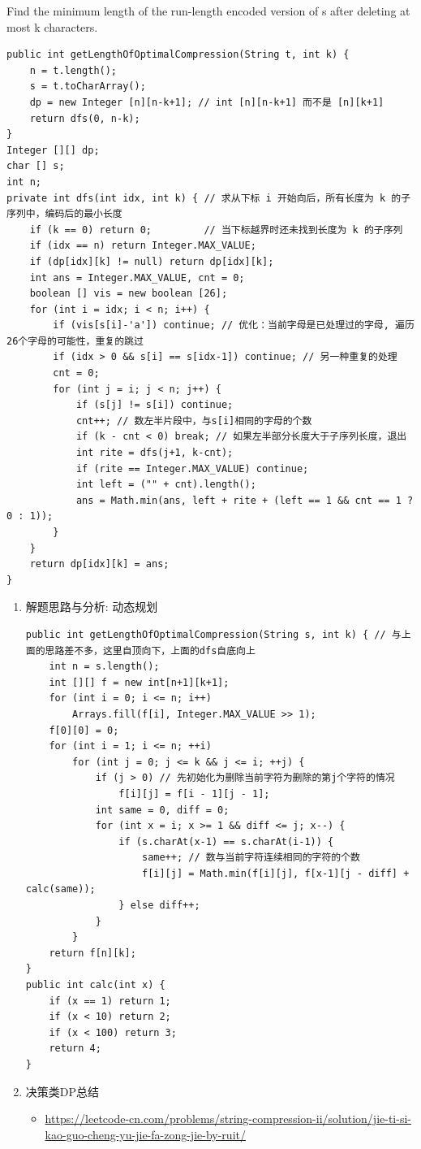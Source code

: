 \documentclass[9pt, b5paaper]{book}
\begin{document}
Find the minimum length of the run-length encoded version of s after deleting at most k characters.
\begin{verbatim}
public int getLengthOfOptimalCompression(String t, int k) {
    n = t.length();
    s = t.toCharArray();
    dp = new Integer [n][n-k+1]; // int [n][n-k+1] 而不是 [n][k+1] 
    return dfs(0, n-k);
}
Integer [][] dp;
char [] s;
int n;
private int dfs(int idx, int k) { // 求从下标 i 开始向后，所有长度为 k 的子序列中，编码后的最小长度
    if (k == 0) return 0;         // 当下标越界时还未找到长度为 k 的子序列
    if (idx == n) return Integer.MAX_VALUE;
    if (dp[idx][k] != null) return dp[idx][k];
    int ans = Integer.MAX_VALUE, cnt = 0;
    boolean [] vis = new boolean [26];
    for (int i = idx; i < n; i++) {
        if (vis[s[i]-'a']) continue; // 优化：当前字母是已处理过的字母, 遍历26个字母的可能性，重复的跳过
        if (idx > 0 && s[i] == s[idx-1]) continue; // 另一种重复的处理
        cnt = 0;
        for (int j = i; j < n; j++) {
            if (s[j] != s[i]) continue;
            cnt++; // 数左半片段中，与s[i]相同的字母的个数
            if (k - cnt < 0) break; // 如果左半部分长度大于子序列长度，退出
            int rite = dfs(j+1, k-cnt);
            if (rite == Integer.MAX_VALUE) continue; 
            int left = ("" + cnt).length();
            ans = Math.min(ans, left + rite + (left == 1 && cnt == 1 ? 0 : 1));
        }
    }
    return dp[idx][k] = ans;
}
\end{verbatim}
\begin{enumerate}
\item 解题思路与分析: 动态规划
\label{sec-1-4-36-1}
\begin{verbatim}
public int getLengthOfOptimalCompression(String s, int k) { // 与上面的思路差不多，这里自顶向下，上面的dfs自底向上
    int n = s.length();
    int [][] f = new int[n+1][k+1];
    for (int i = 0; i <= n; i++) 
        Arrays.fill(f[i], Integer.MAX_VALUE >> 1);
    f[0][0] = 0;
    for (int i = 1; i <= n; ++i) 
        for (int j = 0; j <= k && j <= i; ++j) {
            if (j > 0) // 先初始化为删除当前字符为删除的第j个字符的情况
                f[i][j] = f[i - 1][j - 1];
            int same = 0, diff = 0;
            for (int x = i; x >= 1 && diff <= j; x--) {
                if (s.charAt(x-1) == s.charAt(i-1)) {
                    same++; // 数与当前字符连续相同的字符的个数
                    f[i][j] = Math.min(f[i][j], f[x-1][j - diff] + calc(same));
                } else diff++;
            }
        }
    return f[n][k];
}
public int calc(int x) {
    if (x == 1) return 1;
    if (x < 10) return 2;
    if (x < 100) return 3;
    return 4;
}
\end{verbatim}
\item 决策类DP总结
\label{sec-1-4-36-2}
\begin{itemize}
\item \url{https://leetcode-cn.com/problems/string-compression-ii/solution/jie-ti-si-kao-guo-cheng-yu-jie-fa-zong-jie-by-ruit/}
\end{itemize}
\end{enumerate}
\end{document}
